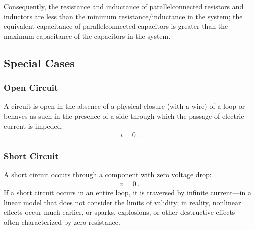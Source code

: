 \documentclass[letterpaper,10pt,english]{jupyterBook}
\begin{document}
\sphinxAtStartPar
Consequently, the resistance and inductance of parallel\sphinxhyphen{}connected resistors and inductors are less than the minimum resistance/inductance in the system; the equivalent capacitance of parallel\sphinxhyphen{}connected capacitors is greater than the maximum capacitance of the capacitors in the system.


\subsection{Special Cases}
\label{\detokenize{ch/circuits-electric-elementary-connections:special-cases}}\label{\detokenize{ch/circuits-electric-elementary-connections:physics-hs-electromagnetism-circuits-electric-circuits}}

\subsubsection{Open Circuit}
\label{\detokenize{ch/circuits-electric-elementary-connections:open-circuit}}\label{\detokenize{ch/circuits-electric-elementary-connections:physics-hs-electromagnetism-circuits-electric-circuits-open}}
\sphinxAtStartPar
A circuit is open in the absence of a physical closure (with a wire) of a loop or behaves as such in the presence of a side through which the passage of electric current is impeded:
\begin{equation*}
\begin{split}i = 0 \ .\end{split}
\end{equation*}

\subsubsection{Short Circuit}
\label{\detokenize{ch/circuits-electric-elementary-connections:short-circuit}}\label{\detokenize{ch/circuits-electric-elementary-connections:physics-hs-electromagnetism-circuits-electric-circuits-short}}
\sphinxAtStartPar
A short circuit occurs through a component with zero voltage drop:
\begin{equation*}
\begin{split}v = 0 \ .\end{split}
\end{equation*}
\sphinxAtStartPar
If a short circuit occurs in an entire loop, it is traversed by infinite current—in a linear model that does not consider the limits of validity; in reality, non\sphinxhyphen{}linear effects occur much earlier, or sparks, explosions, or other destructive effects—often characterized by zero resistance.  
\end{document}
